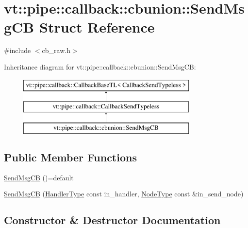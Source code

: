 \hypertarget{structvt_1_1pipe_1_1callback_1_1cbunion_1_1_send_msg_c_b}{}\section{vt\+:\+:pipe\+:\+:callback\+:\+:cbunion\+:\+:Send\+Msg\+CB Struct Reference}
\label{structvt_1_1pipe_1_1callback_1_1cbunion_1_1_send_msg_c_b}


{\ttfamily \#include $<$cb\+\_\+raw.\+h$>$}

Inheritance diagram for vt\+:\+:pipe\+:\+:callback\+:\+:cbunion\+:\+:Send\+Msg\+CB\+:\begin{figure}[H]
\begin{center}
\leavevmode
\includegraphics[height=3.000000cm]{structvt_1_1pipe_1_1callback_1_1cbunion_1_1_send_msg_c_b}
\end{center}
\end{figure}
\subsection*{Public Member Functions}
\begin{DoxyCompactItemize}
\item 
\hyperlink{structvt_1_1pipe_1_1callback_1_1cbunion_1_1_send_msg_c_b_aeff567bb0ba46e5eabf67c9bab9ff331}{Send\+Msg\+CB} ()=default
\item 
\hyperlink{structvt_1_1pipe_1_1callback_1_1cbunion_1_1_send_msg_c_b_a10c77770d00c2a7f40036b4d7d147502}{Send\+Msg\+CB} (\hyperlink{namespacevt_af64846b57dfcaf104da3ef6967917573}{Handler\+Type} const in\+\_\+handler, \hyperlink{namespacevt_a866da9d0efc19c0a1ce79e9e492f47e2}{Node\+Type} const \&in\+\_\+send\+\_\+node)
\end{DoxyCompactItemize}


\subsection{Constructor \& Destructor Documentation}
\mbox{\label{structvt_1_1pipe_1_1callback_1_1cbunion_1_1_send_msg_c_b_aeff567bb0ba46e5eabf67c9bab9ff331}} 
